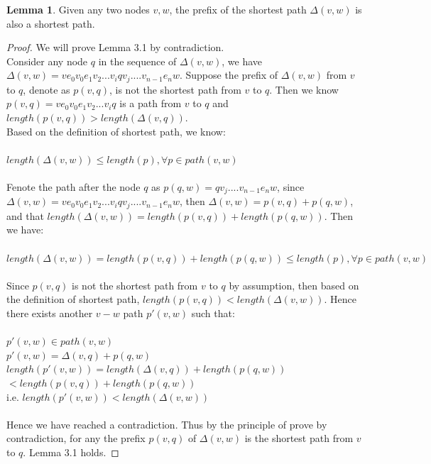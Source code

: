 \documentclass[11pt, oneside]{article}   	%
\newcommand\tab[1][1cm]{\hspace*{#1}}
\newcommand\ftab[1][5cm]{\hspace*{#1}}
\newcommand\tsp[1][0.2cm]{\hspace*{#1}}
\newcommand\htab[1][0.5cm]{\hspace*{#1}}
\theoremstyle{definition}
\newtheorem{sublemma}{Lemma}[section]
\begin{document}
\begin{sublemma}
Given any two nodes $v, w$, the prefix of the shortest path $\Delta(v, w)$ is also a shortest path. 
\end{sublemma}
\begin{proof}
We will prove Lemma 3.1 by contradiction. 
\\
Consider any node $q$ in the sequence of $\Delta(v, w)$, we have $\Delta(v, w) = ve_0v_0e_1v_2...v_i q v_j....v_{n-1}e_nw$. Suppose the prefix of $\Delta(v, w)$ from $v$ to $q$, denote as $p(v, q)$, is not the shortest path from $v$ to $q$. Then we know $p(v, q) = ve_0v_0e_1v_2...v_iq$ is a path from $v$ to $q$ and $length(p(v, q)) > length(\Delta(v, q))$. 
\\
Based on the definition of shortest path, we know: 
\\\\
\ftab $length(\Delta(v, w)) \leq length(p), \forall  p \in path(v, w)$
\\\\
Fenote the path after the node $q$ as $p(q, w) = q v_j....v_{n-1}e_nw$, since $\Delta(v, w) = ve_0v_0e_1v_2...v_i q v_j....v_{n-1}e_nw$, then $\Delta(v, w) = p(v, q) + p(q, w)$, and that $length(\Delta(v, w)) = length(p(v, q)) + length(p(q, w))$. Then we have: 
\\\\
\tab$length(\Delta(v, w)) = length(p(v, q)) + length(p(q, w)) \leq length(p), \forall p \in path(v, w)$
\\\\
Since $p(v, q)$ is not the shortest path from $v$ to $q$ by assumption, then based on the definition of shortest path, $length(p(v, q)) < length(\Delta(v, w))$. Hence there exists another $v-w$ path $p'(v, w)$ such that: 
\\\\
\ftab $p'(v, w) \in path(v, w)$\\
\ftab $p'(v, w) = \Delta(v, q) + p(q, w)$ \\ 
\ftab $length(p'(v, w)) = length(\Delta(v, q)) + length(p(q, w))$ \\ 
\ftab\tab\tab\htab\tsp$< length(p(v, q)) + length(p(q, w))$ \\
\ftab i.e. $length(p'(v, w)) < length(\Delta(v, w))$
\\\\
Hence we have reached a contradiction. Thus by the principle of prove by contradiction, for any the prefix $p(v, q)$ of $\Delta(v, w)$ is the shortest path from $v$ to $q$. Lemma 3.1 holds. 
\end{proof}
\tab \\
\end{document}
